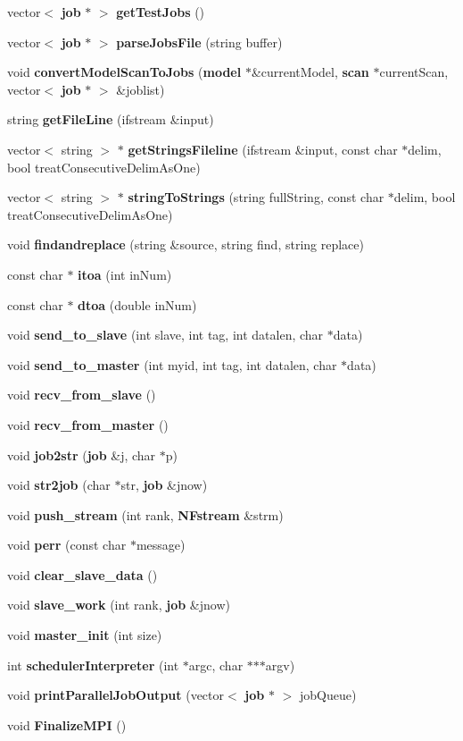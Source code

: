\begin{CompactItemize}
\item 
vector$<$ {\bf job} $\ast$ $>$ {\bf getTestJobs} ()
\item 
vector$<$ {\bf job} $\ast$ $>$ {\bf parseJobsFile} (string buffer)
\item 
void {\bf convertModelScanToJobs} ({\bf model} $\ast$\&currentModel, {\bf scan} $\ast$currentScan, vector$<$ {\bf job} $\ast$ $>$ \&joblist)
\item 
string {\bf getFileLine} (ifstream \&input)
\item 
vector$<$ string $>$ $\ast$ {\bf getStringsFileline} (ifstream \&input, const char $\ast$delim, bool treatConsecutiveDelimAsOne)
\item 
vector$<$ string $>$ $\ast$ {\bf stringToStrings} (string fullString, const char $\ast$delim, bool treatConsecutiveDelimAsOne)
\item 
void {\bf findandreplace} (string \&source, string find, string replace)
\item 
const char $\ast$ {\bf itoa} (int inNum)
\item 
const char $\ast$ {\bf dtoa} (double inNum)
\item 
void {\bf send\_\-to\_\-slave} (int slave, int tag, int datalen, char $\ast$data)
\item 
void {\bf send\_\-to\_\-master} (int myid, int tag, int datalen, char $\ast$data)
\item 
void {\bf recv\_\-from\_\-slave} ()
\item 
void {\bf recv\_\-from\_\-master} ()
\item 
void {\bf job2str} ({\bf job} \&j, char $\ast$p)
\item 
void {\bf str2job} (char $\ast$str, {\bf job} \&jnow)
\item 
void {\bf push\_\-stream} (int rank, {\bf NFstream} \&strm)
\item 
void {\bf perr} (const char $\ast$message)
\item 
void {\bf clear\_\-slave\_\-data} ()
\item 
void {\bf slave\_\-work} (int rank, {\bf job} \&jnow)
\item 
void {\bf master\_\-init} (int size)
\item 
int {\bf schedulerInterpreter} (int $\ast$argc, char $\ast$$\ast$$\ast$argv)
\item 
void {\bf printParallelJobOutput} (vector$<$ {\bf job} $\ast$ $>$ jobQueue)
\item 
void {\bf FinalizeMPI} ()

\end{CompactItemize}
